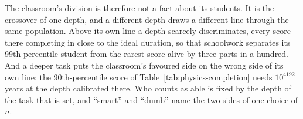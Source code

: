 \documentclass{article}
\begin{document}
The classroom's division is therefore not a fact about its students. It is the crossover of one depth, and a different depth draws a different line through the same population. Above its own line a depth scarcely discriminates, every score there completing in close to the ideal duration, so that schoolwork separates its 99th-percentile student from the rarest score alive by three parts in a hundred. And a deeper task puts the classroom's favoured side on the wrong side of its own line: the 90th-percentile score of Table~\ref{tab:physics-completion} needs $10^{4192}$ years at the depth calibrated there. Who counts as able is fixed by the depth of the task that is set, and ``smart'' and ``dumb'' name the two sides of one choice of $n$.
\end{document}
